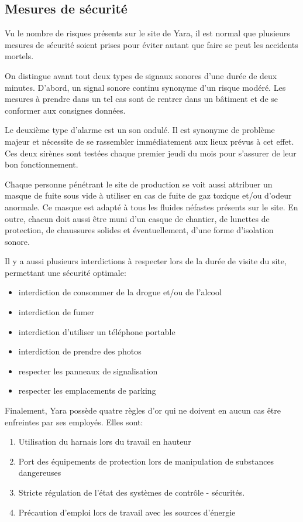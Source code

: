 \documentclass[a4paper,12pt, oneside]{article}
\begin{document}
	\subsection{Mesures de sécurité}
		Vu le nombre de risques présents sur le site de Yara, il est normal que plusieurs mesures de sécurité soient prises pour éviter autant que faire se peut les accidents mortels. 
		
		On distingue avant tout deux types de signaux sonores d'une durée de deux minutes. D'abord, un signal sonore continu synonyme d'un risque modéré. Les mesures à prendre dans un tel cas sont de rentrer dans un bâtiment et de se conformer aux consignes  données. 
		
		Le deuxième type d'alarme est un son ondulé. Il est synonyme de problème majeur et nécessite de se rassembler immédiatement aux lieux prévus à cet effet. Ces deux sirènes sont testées chaque premier jeudi du mois pour s'assurer de leur bon fonctionnement.
		
		Chaque personne pénétrant le site de production se voit aussi attribuer un masque de fuite sous vide à utiliser en cas de fuite de gaz toxique et/ou d'odeur anormale. Ce masque est adapté à tous les fluides néfastes présents sur le site. En outre, chacun doit aussi être muni d'un casque de chantier, de lunettes de protection, de chaussures solides et éventuellement, d'une forme d'isolation sonore.
		
		Il y a aussi plusieurs interdictions à respecter lors de la durée de visite du site, permettant une sécurité optimale:
			\begin{itemize}
			\item interdiction de consommer de la drogue et/ou de l'alcool
			\item interdiction de fumer
			\item interdiction d'utiliser un téléphone portable
			\item interdiction de prendre des photos
			\item respecter les panneaux de signalisation
			\item respecter les emplacements de parking
			\end{itemize}
		
		Finalement, Yara possède quatre règles d'or qui ne doivent en aucun cas être enfreintes par ses employés. Elles sont:
			\begin{enumerate}
			\item Utilisation du harnais lors du travail en hauteur
			\item Port des équipements de protection lors de manipulation de substances dangereuses
			\item Stricte régulation de l'état des systèmes de contrôle - sécurités.
			\item Précaution d'emploi lors de travail avec les sources d'énergie
			\end{enumerate}
		
\end{document}

